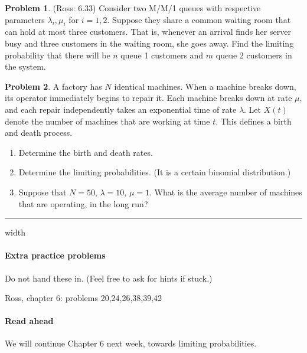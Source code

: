 \documentclass{article}
\theoremstyle{definition}
\newtheorem{problem}{Problem}
\begin{document}

\begin{problem}(Ross: 6.33)
  Consider two M/M/1 queues with respective parameters $\lambda_i,\mu_i$ for $i = 1,2$.
  Suppose they share a common waiting room that can hold at most three customers. 
  That is, whenever an arrival finds her server busy and three customers in the
  waiting room, she goes away.
  Find the limiting probability that there will be $n$ queue 1 customers and $m$ queue 2 customers in the system.
\end{problem}


\begin{problem}
  A factory has $N$ identical machines.
  When a machine breaks down, its operator immediately begins to repair it.
  Each machine breaks down at rate $\mu$, and each repair independently takes an exponential time of rate $\lambda$.
  Let $X(t)$ denote the number of machines that are working at time $t$.
  This defines a birth and death process.
  \begin{enumerate}
  \item Determine the birth and death rates.
  \item Determine the limiting probabilities. (It is a certain binomial distribution.)
  \item Suppose that $N=50$, $\lambda = 10$, $\mu = 1$.
    What is the average number of machines that are operating, in the long run?
  \end{enumerate}
\end{problem}


\hrule width \textwidth

\paragraph{Extra practice problems}
Do not hand these in. (Feel free to ask for hints if stuck.)

Ross, chapter 6: problems 20,24,26,38,39,42

\paragraph{Read ahead}
We will continue Chapter 6 next week, towards limiting probabilities.
\end{document}
